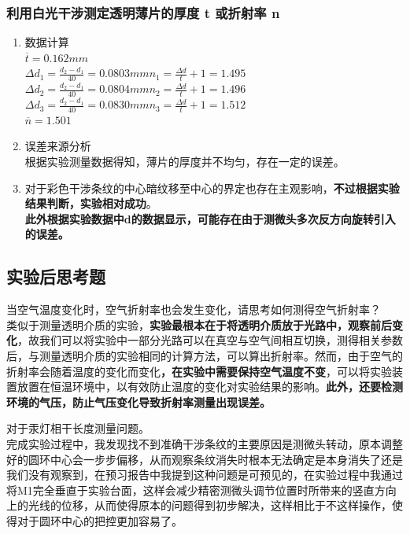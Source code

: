 \documentclass[dvipsnames, svgnames,a4paper,11pt]{article}
\begin{document}
	\subsubsection{ 利用白光干涉测定透明薄片的厚度 t 或折射率 n}
	\begin{enumerate}
		\item 数据计算\\
		$\overline{t}=0.162mm$\\
			$\Delta d_{1}=\frac{d_{2}-d_{1}}{40}=0.0803mm$\hspace{0.2cm}$n_{1}=\frac{\Delta d}{t}+1=1.495$\\
			$\Delta d_{2}=\frac{d_{2}-d_{1}}{40}=0.0804mm$\hspace{0.2cm}$n_{2}=\frac{\Delta d}{t}+1=1.496$\\
			$\Delta d_{3}=\frac{d_{2}-d_{1}}{40}=0.0830mm$\hspace{0.2cm}$n_{3}=\frac{\Delta d}{t}+1=1.512$\\
			$\overline{n}=1.501$
				\item 误差来源分析\\
				根据实验测量数据得知，薄片的厚度并不均匀，存在一定的误差。
				\item 对于彩色干涉条纹的中心暗纹移至中心的界定也存在主观影响，\textbf{不过根据实验结果判断，实验相对成功}。\\
				\textbf{此外根据实验数据中d的数据显示，可能存在由于测微头多次反方向旋转引入的误差。}
				
		
	\end{enumerate}
	

	\subsection{实验后思考题}
	
	\begin{question}
		 当空气温度变化时，空气折射率也会发生变化，请思考如何测得空气折射率？\\
		 类似于测量透明介质的实验，\textbf{实验最根本在于将透明介质放于光路中，观察前后变化}，故我们可以将实验中一部分光路可以在真空与空气间相互切换，测得相关参数后，与测量透明介质的实验相同的计算方法，可以算出折射率。然而，由于空气的折射率会随着温度的变化而变化\textbf{，在实验中需要保持空气温度不变}，可以将实验装置放置在恒温环境中，以有效防止温度的变化对实验结果的影响。\textbf{此外，还要检测环境的气压，防止气压变化导致折射率测量出现误差。}
	\end{question}
	\begin{question}
		对于汞灯相干长度测量问题。\\
		完成实验过程中，我发现找不到准确干涉条纹的主要原因是测微头转动，原本调整好的圆环中心会一步步偏移，从而观察条纹消失时根本无法确定是本身消失了还是我们没有观察到，在预习报告中我提到这种问题是可预见的，在实验过程中我通过将M1完全垂直于实验台面，这样会减少精密测微头调节位置时所带来的竖直方向上的光线的位移，从而使得原本的问题得到初步解决，这样相比于不这样操作，使得对于圆环中心的把控更加容易了。
	\end{question}
	
\end{document}
